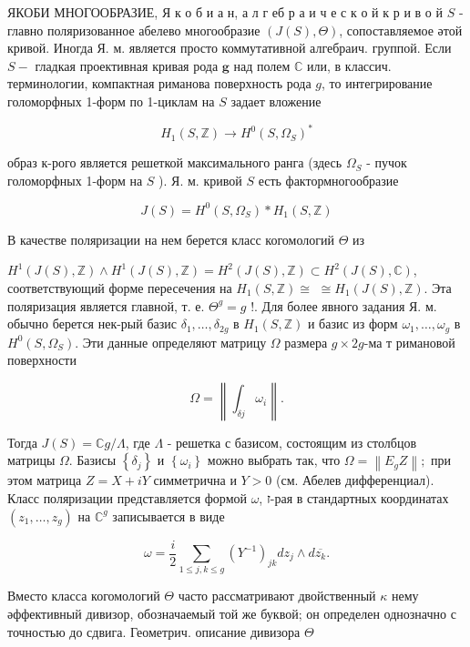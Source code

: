 \documentclass[10pt]{article}
\begin{document}
ЯКОБИ МНОГООБРАЗИЕ, Я к о б и а н, а л г еб р а и ч е с к о й к р и в о й $S$ - главно поляризованное абелево многообразие $(J(S), \Theta)$, сопоставляемое әтой кривой. Иногда Я. м. является просто коммутативной алгебраич. группой. Если $S-$ гладкая проективная кривая рода $\boldsymbol{g}$ над полем $\mathbb{C}$ или, в классич. терминологии, компактная риманова поверхность рода $g$, то интегрирование голоморфных 1-форм по 1-циклам на $S$ задает вложение



\[

H_{1}(S, \mathbb{Z}) \longrightarrow H^{0}\left(S, \Omega_{S}\right)^{*}

\]



образ к-рого является решеткой максимального ранга (здесь $\Omega_{S}$ - пучок голоморфных 1-форм на $S$ ). Я. м. кривой $S$ есть фактормногообразие



\[

J(S)=H^{0}\left(S, \Omega_{S}\right) * H_{1}(S, \mathbb{Z})

\]



В качестве поляризации на нем берется класс когомологий $\Theta$ из



$H^{1}(J(S), \mathbb{Z}) \wedge H^{1}(J(S), \mathbb{Z})=H^{2}(J(S), \mathbb{Z}) \subset H^{2}(J(S), \mathbb{C})$, соответствующий форме пересечения на $H_{1}(S, \mathbb{Z}) \cong$ $\cong H_{1}(J(S), \mathbb{Z})$. Эта поляризация является главной, т. е. $\Theta^{g}=g$ !. Для более явного задания Я. м. обычно берется нек-рый базис $\delta_{1}, \ldots, \delta_{2 g}$ в $H_{1}(S, \mathbb{Z})$ и базис из форм $\omega_{1}, \ldots, \omega_{g}$ в $H^{0}\left(S, \Omega_{S}\right)$. Эти данные определяют матрицу $\Omega$ размера $g \times 2 g$-ма т римановой поверхности



\[

\Omega=\left\|\int_{\delta j} \omega_{i}\right\| .

\]



Тогда $J(S)=\mathbb{C} g / \Lambda$, где $\Lambda$ - решетка с базисом, состоящим из столбцов матрицы $\Omega$. Базисы $\left\{\delta_{j}\right\}$ и $\left\{\omega_{i}\right\}$ можно выбрать так, что $\Omega=\left\|E_{g} Z\right\| ;$ при этом матрица $Z=X+i Y$ симметрична и $Y>0$ (см. Абелев дифференциал). Класс поляризации представляется формой $\omega$, ז-рая в стандартных координатах $\left(z_{1}, \ldots, z_{g}\right)$ на $\mathbb{C}^{g}$ записывается в виде



\[

\omega=\frac{i}{2} \sum_{1 \leqslant j, k \leqslant g}\left(Y^{-1}\right)_{j k} d z_{j} \wedge d \overline{z_{k}} .

\]



Вместо класса когомологий $\Theta$ часто рассматривают двойственный $\kappa$ нему әффективный дивизор, обозначаемый той же буквой; он определен однозначно с точностью до сдвига. Геометрич. описание дивизора $\Theta$
\end{document}
